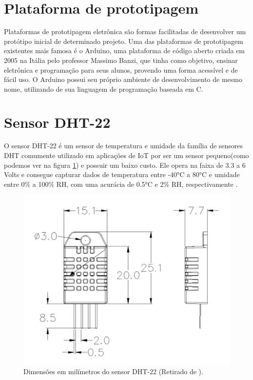 \section{Plataforma de prototipagem}
\label{fund:plataforma-proto}
Plataformas de prototipagem eletrônica são formas facilitadas de desenvolver um protótipo inicial de determinado projeto. Uma das plataformas de prototipagem existentes mais famosa é o Arduino, uma plataforma de código aberto criada em 2005 na Itália pelo professor Massimo Banzi, que tinha como objetivo, ensinar eletrônica e programação para seus alunos, provendo uma forma acessível e de fácil uso. O Arduino possui seu próprio ambiente de desenvolvimento de mesmo nome, utilizando de sua linguagem de programação baseada em C.

\section{Sensor DHT-22}
\label{fund:dht-22}
O sensor DHT-22 é um sensor de temperatura e umidade da família de sensores DHT comumente utilizado em aplicações de IoT por ser um sensor pequeno(como podemos ver na figura \ref{fig:dht-22}) e possuir um baixo custo. Ele opera na faixa de 3.3 a 6 Volts e consegue capturar dados de temperatura entre -40°C a 80°C e umidade entre 0\% a 100\% RH, com uma acurácia de 0.5°C e 2\% RH, respectivamente \cite{datasheetDHT22}.

\begin{figure}[H]
  \centering
  \includegraphics[width=.80\textwidth]{assets/dht-22.png} 
  \caption{Dimensões em milímetros do sensor DHT-22 (Retirado de \cite{datasheetDHT22}).}
  \label{fig:dht-22} 
\end{figure}

